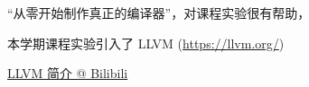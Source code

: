 \begin{frame}{}
  \begin{center}
    ``从零开始制作真正的编译器''，对课程实验很有帮助，
  \end{center}
\end{frame}

\begin{frame}{}

  \begin{center}
    本学期课程实验引入了 LLVM (\url{https://llvm.org/})
  \end{center}
\end{frame}

\begin{frame}{}

  \vspace{0.20cm}
  \begin{center}
    \href{https://www.bilibili.com/video/BV1RF411K7F5/?vd_source=e3cbbf5ca80db268fa006d63626e267e}{LLVM 简介 @ Bilibili}
  \end{center}
\end{frame}

